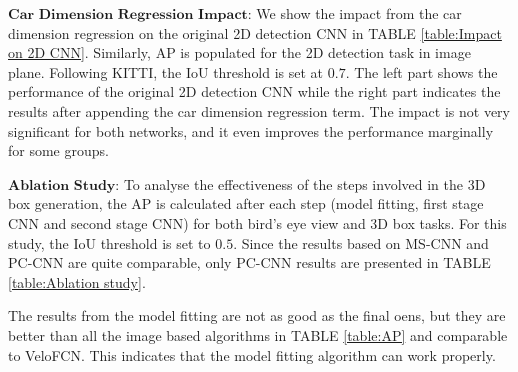 \documentclass[letterpaper, 10 pt, conference]{ieeeconf}  \usepackage[
\begin{document}
$\textbf{Car Dimension Regression Impact:}$  We show the impact from the car dimension regression on the original 2D detection CNN in TABLE \ref{table:Impact on 2D CNN}. Similarly, AP is populated for the 2D detection task in image plane. Following KITTI, the IoU threshold is set at $0.7$. The left part shows the performance of the original 2D detection CNN while the right part indicates the results after appending the car dimension regression term. The impact is not very significant for both networks, and it even improves the performance marginally for some groups.

\begin{table}[h]
\centering
\caption{Impact on the original 2D detection CNN from appending the car dimension regression term.}
\label{table:Impact on 2D CNN}
\end{table}

$\textbf{Ablation Study:}$ To analyse the effectiveness of the steps involved in the 3D box generation, the AP is calculated after each step (model fitting, first stage CNN and second stage CNN) for both bird's eye view and 3D box tasks. For this study, the IoU threshold is set to $0.5$. Since the results based on MS-CNN and PC-CNN are quite comparable, only PC-CNN results are presented in TABLE \ref{table:Ablation study}. 

The results from the model fitting are not as good as the final oens, but they are better than all the image based algorithms  in TABLE \ref{table:AP} and comparable to VeloFCN. This indicates that the model fitting algorithm can work properly. 

\begin{table}[h]
\centering
\caption{Ablation study based on KITTI validation set. Numbers indicate AP with IoU threshold at 0.5.}
\label{table:Ablation study}
\end{table}
\end{document}
